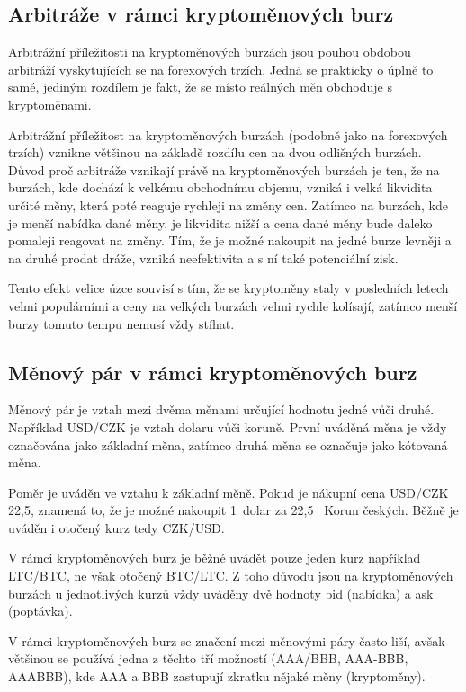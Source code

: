 \documentclass[thesis=B,czech]{FITthesis}[2019/03/21]
\begin{document}
\subsection{Arbitráže v rámci kryptoměnových burz}
Arbitrážní příležitosti na kryptoměnových burzách jsou pouhou obdobou arbitráží vyskytujících se na forexových trzích. Jedná se prakticky o úplně to samé, jediným rozdílem je fakt, že se místo reálných měn obchoduje s kryptoměnami. 

Arbitrážní příležitost na kryptoměnových burzách (podobně jako na forexových trzích) vznikne většinou na základě rozdílu cen na dvou odlišných burzách. Důvod proč arbitráže vznikají právě na kryptoměnových burzách je ten, že na burzách, kde dochází k velkému obchodnímu objemu, vzniká i velká likvidita určité měny, která poté reaguje rychleji na změny cen. Zatímco na burzách, kde je menší nabídka dané měny, je likvidita nižší a cena dané měny bude daleko pomaleji reagovat na změny. Tím, že je možné nakoupit na jedné burze levněji a na druhé prodat dráže, vzniká neefektivita a s ní také potenciální zisk.

Tento efekt velice úzce souvisí s tím, že se kryptoměny staly v posledních letech velmi populárními a ceny na velkých burzách velmi rychle kolísají, zatímco menší burzy tomuto tempu nemusí vždy stíhat. \cite{finder}

\subsection{Měnový pár v rámci kryptoměnových burz}
Měnový pár je vztah mezi dvěma měnami určující hodnotu jedné vůči druhé. Například USD/CZK je vztah dolaru vůči koruně. První uváděná měna je vždy označována jako základní měna, zatímco druhá měna se označuje jako kótovaná měna. \cite{Capital_menovy_par} 

Poměr je uváděn ve vztahu k základní měně. Pokud je nákupní cena USD/CZK 22,5, znamená to, že je možné nakoupit 1~dolar za 22,5~ Korun českých. Běžně je uváděn i otočený kurz tedy CZK/USD. \cite{Capital_menovy_par} 

V rámci kryptoměnových burz je běžné uvádět pouze jeden kurz například LTC/BTC, ne však otočený BTC/LTC. Z toho důvodu jsou na kryptoměnových burzách u jednotlivých kurzů vždy uváděny dvě hodnoty bid (nabídka) a ask (poptávka). 

V rámci kryptoměnových burz se značení mezi měnovými páry často liší, avšak většinou se používá jedna z těchto tří možností (AAA/BBB, AAA-BBB, AAABBB), kde AAA a BBB zastupují zkratku nějaké měny (kryptoměny).
\end{document}
